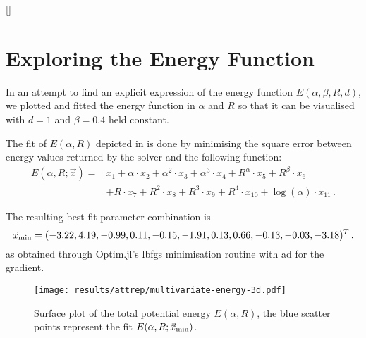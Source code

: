 \appendix
{}[\vspace{4.5cm}]
\titlespacing{\chapter}{0cm}{0cm}{0cm}

\chapter{Exploring the Energy Function}
\label{chap:memo-on-the-energy}
In an attempt to find an explicit expression of the energy function $E(\alpha, \beta, R, d)$, we plotted and fitted the energy function in $\alpha$ and $R$ so that it can be visualised with $d = 1$ and $\beta = 0.4$ held constant.

The fit of $E(\alpha, R)$ depicted in  is done by minimising the square error between energy values returned by the solver and the following function:
\begin{align*}
  E(\alpha, R; \vec{x}) = & x_{1} + \alpha \cdot x_{2} + \alpha^2 \cdot x_{3} + \alpha^3 \cdot x_{4} + R^\alpha \cdot x_{5} + R^\beta \cdot x_{6} \\
                          & + R \cdot x_{7} + R^2 \cdot x_{8} + R^3 \cdot x_{9} + R^4 \cdot x_{10} + \log(\alpha) \cdot x_{11}\,.
\end{align*}

The resulting best-fit parameter combination is
$$\vec{x}_{\rm min} = (
  -3.22,
  4.19,
  -0.99,
  0.11,
  -0.15,
  -1.91,
  0.13,
  0.66,
  -0.13,
  -0.03,
  -3.18
  )^T\,.$$
as obtained through Optim.jl's \gls{lbfgs} minimisation routine \parencite{2023-optim-jl} with \gls{ad} for the gradient.

\begin{figure}[H]
  \centering
  \texttt{[image: results/attrep/multivariate-energy-3d.pdf]}
  \caption[Surface plot of the total potential energy $E(\alpha, R)$]{Surface plot of the total potential energy $E(\alpha, R)$, the blue scatter points represent the fit $E(\alpha, R; \vec{x}_{\rm min})$.}
  \label{fig:multivariate-energy-3d}
\end{figure}

